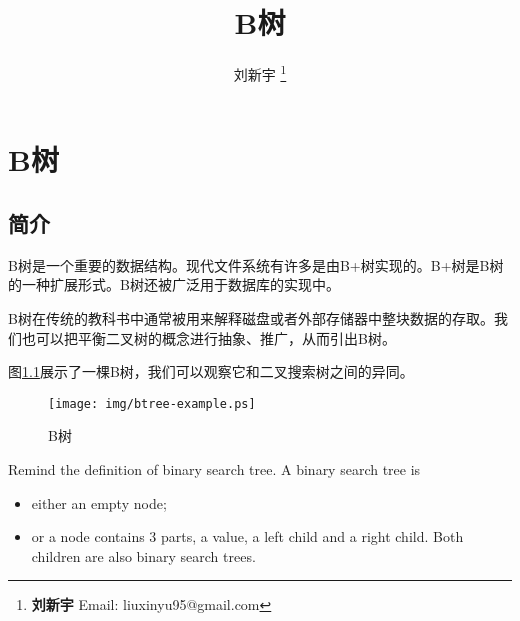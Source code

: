\documentclass[UTF8]{article}
\begin{document}


\title{B树}

\author{刘新宇
\thanks{{\bfseries 刘新宇 } \newline
  Email: liuxinyu95@gmail.com \newline}
  }

\maketitle
\fi


\ifx\wholebook\relax
\chapter{B树}
\fi


\section{简介}
\label{introduction}

B树是一个重要的数据结构。现代文件系统有许多是由B+树实现的。B+树是B树的一种扩展形式。B树还被广泛用于数据库的实现中。

B树在传统的教科书中通常被用来解释磁盘或者外部存储器中整块数据的存取\cite{CLRS}。我们也可以把平衡二叉树的概念进行抽象、推广，从而引出B树\cite{wiki-b-tree}。

图\ref{fig:btree-example}展示了一棵B树，我们可以观察它和二叉搜索树之间的异同。

\begin{figure}[htbp]
   \begin{center}
	\texttt{[image: img/btree-example.ps]}
   \caption{B树} \label{fig:btree-example}
   \end{center}
\end{figure}

Remind the definition of binary search tree. A binary search tree is
\begin{itemize}
\item either an empty node;
\item or a node contains 3 parts, a value, a left child and a right child.
Both children are also binary search trees.
\end{itemize}
\end{document}
